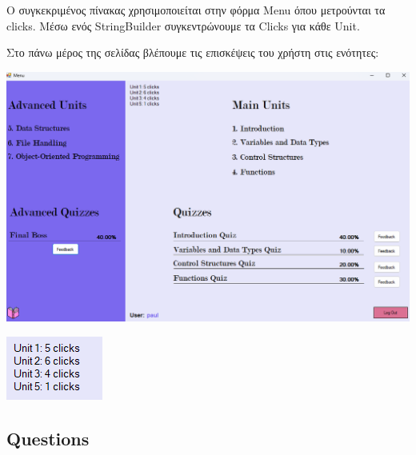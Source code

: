 \documentclass[12pt]{article}
\newcommand{\en}[1]{\foreignlanguage{English}{#1}}
\begin{document}
Ο συγκεκριμένος πίνακας χρησιμοποιείται στην φόρμα \en{Menu} όπου μετρούνται τα \en{clicks}.
Μέσω ενός \en{StringBuilder} συγκεντρώνουμε τα \en{Clicks} για κάθε \en{Unit}.
\newline


Στο πάνω μέρος της σελίδας βλέπουμε τις επισκέψεις του χρήστη στις ενότητες:
\begin{center}
  
    \includegraphics[width=1\linewidth]{clicksexample.png}
\end{center}

\begin{center}
    \includegraphics[width=0.5\linewidth]{theclicks.png}
\end{center}




\newpage
\subsection*{\en{Questions}}
\end{document}
